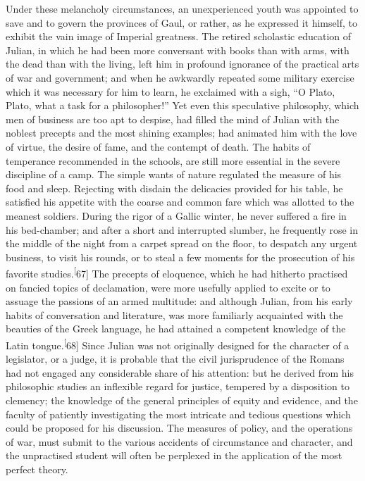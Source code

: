 Under these melancholy circumstances, an unexperienced youth was
appointed to save and to govern the provinces of Gaul, or rather,
as he expressed it himself, to exhibit the vain image of Imperial
greatness. The retired scholastic education of Julian, in which
he had been more conversant with books than with arms, with the
dead than with the living, left him in profound ignorance of the
practical arts of war and government; and when he awkwardly
repeated some military exercise which it was necessary for him to
learn, he exclaimed with a sigh, “O Plato, Plato, what a task for
a philosopher!” Yet even this speculative philosophy, which men
of business are too apt to despise, had filled the mind of Julian
with the noblest precepts and the most shining examples; had
animated him with the love of virtue, the desire of fame, and the
contempt of death. The habits of temperance recommended in the
schools, are still more essential in the severe discipline of a
camp. The simple wants of nature regulated the measure of his
food and sleep. Rejecting with disdain the delicacies provided
for his table, he satisfied his appetite with the coarse and
common fare which was allotted to the meanest soldiers. During
the rigor of a Gallic winter, he never suffered a fire in his
bed-chamber; and after a short and interrupted slumber, he
frequently rose in the middle of the night from a carpet spread
on the floor, to despatch any urgent business, to visit his
rounds, or to steal a few moments for the prosecution of his
favorite studies.\textsuperscript[67] The precepts of eloquence, which he had
hitherto practised on fancied topics of declamation, were more
usefully applied to excite or to assuage the passions of an armed
multitude: and although Julian, from his early habits of
conversation and literature, was more familiarly acquainted with
the beauties of the Greek language, he had attained a competent
knowledge of the Latin tongue.\textsuperscript[68] Since Julian was not originally
designed for the character of a legislator, or a judge, it is
probable that the civil jurisprudence of the Romans had not
engaged any considerable share of his attention: but he derived
from his philosophic studies an inflexible regard for justice,
tempered by a disposition to clemency; the knowledge of the
general principles of equity and evidence, and the faculty of
patiently investigating the most intricate and tedious questions
which could be proposed for his discussion. The measures of
policy, and the operations of war, must submit to the various
accidents of circumstance and character, and the unpractised
student will often be perplexed in the application of the most
perfect theory.

